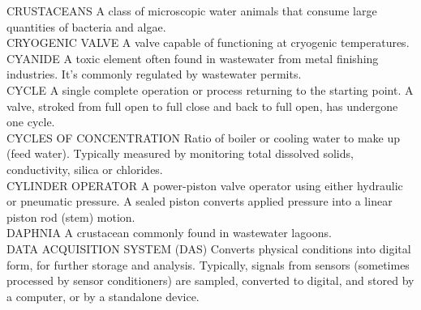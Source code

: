 CRUSTACEANS
A class of microscopic water animals that consume large quantities of bacteria and algae.
\vspace{0.3cm}\\
CRYOGENIC VALVE
A valve capable of functioning at cryogenic temperatures.
\vspace{0.3cm}\\
CYANIDE
A toxic element often found in wastewater from metal finishing industries. It’s commonly regulated by wastewater permits.
\vspace{0.3cm}\\
CYCLE
A single complete operation or process returning to the starting point. A valve, stroked from full open to full close and back to full open, has undergone one cycle.
\vspace{0.3cm}\\
CYCLES OF CONCENTRATION
Ratio of boiler or cooling water to make up (feed water). Typically measured by monitoring total dissolved solids, conductivity, silica or chlorides.
\vspace{0.3cm}\\
CYLINDER OPERATOR
A power-piston valve operator using either hydraulic or pneumatic pressure. A sealed piston converts applied pressure into a linear piston rod (stem) motion.
\vspace{0.3cm}\\
DAPHNIA
A crustacean commonly found in wastewater lagoons.
\vspace{0.3cm}\\
DATA ACQUISITION SYSTEM (DAS)
Converts physical conditions into digital form, for further storage and analysis. Typically, signals from sensors (sometimes processed by sensor conditioners) are sampled, converted to digital, and stored by a computer, or by a standalone device.
\vspace{0.3cm}\\


